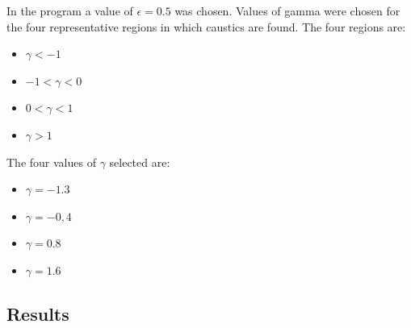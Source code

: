 \documentclass[a4paper]{IEEEtran}
\begin{document}
    In the program a value of $\epsilon = 0.5$ was chosen. Values
    of gamma were chosen for the four representative regions in which
    caustics are found. The four regions are:
    \begin{itemize}
        \item $\gamma < -1$
        \item $-1 < \gamma < 0$
        \item $0 < \gamma < 1$
        \item $\gamma > 1$
    \end{itemize}
    The four values of $\gamma$ selected are:
    \begin{itemize}
        \item $\gamma = -1.3$ 
        \item $\gamma = -0,4$
        \item $\gamma = 0.8$
        \item $\gamma = 1.6$
    \end{itemize}

\newpage

    \subsection{Results}
\end{document}
